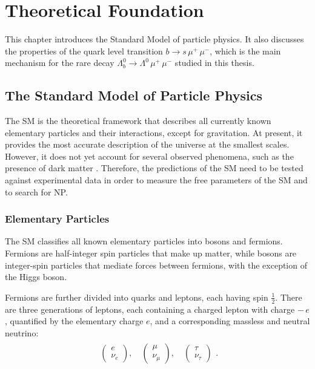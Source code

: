 \chapter{Theoretical Foundation}
\label{ch:theory}
This chapter introduces the Standard Model of particle physics. It also discusses
the properties of the quark level transition $b \to s \, \mu^+ \, \mu^-$, which is the main mechanism for the rare decay 
$\Lambda_b^0 \to \Lambda^0 \, \mu^+ \, \mu^-$ studied in this thesis.


\section{The Standard Model of Particle Physics}
\label{sec:standard-model}
The SM \cite{salam1959,glashow1959,weinberg1967} is the theoretical framework that describes all currently known elementary particles and their interactions, except for gravitation. At present, it provides the most accurate description of the universe at the smallest scales. However, it does not yet account for several observed phenomena, such as the presence of dark matter \cite{rubin1970}. Therefore, the predictions of the SM need to be tested against experimental data in order to measure the free parameters of the SM and to search for NP.

\subsection{Elementary Particles}
\label{subsec:fundamental-particles}
The SM classifies all known elementary particles into bosons and fermions. Fermions are half-integer spin
particles that make up matter, while bosons are integer-spin particles that mediate forces between fermions, 
with the exception of the Higgs boson. 

Fermions are further divided into quarks and leptons, each having spin $\tfrac{1}{2}$. There are three 
generations of leptons, each containing a charged lepton with charge $-\,e$, quantified by the elementary 
charge $e$, and a corresponding massless and neutral neutrino:
\begin{align*}
    \begin{array}{c}
        \begin{pmatrix}
            e \\
            \nu_e 
        \end{pmatrix},\quad
        \begin{pmatrix}
            \mu \\
            \nu_\mu
        \end{pmatrix},\quad
        \begin{pmatrix}
            \tau \\
            \nu_\tau
        \end{pmatrix}
    \end{array}
    .
\end{align*}


